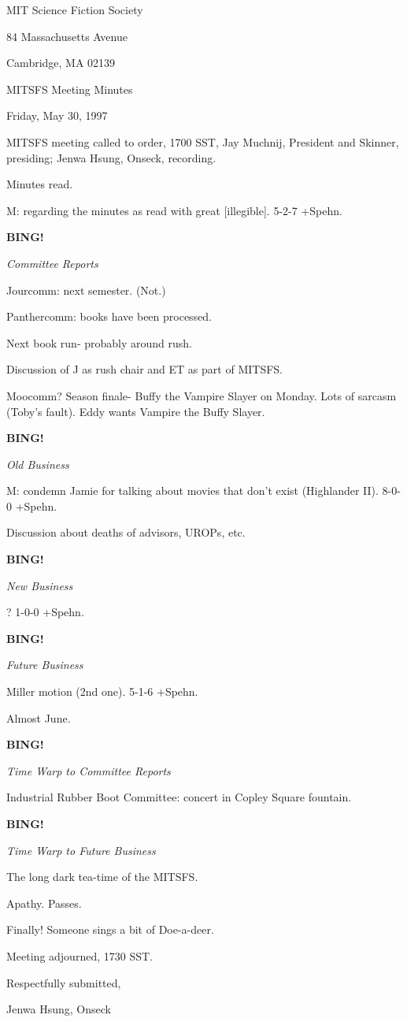 \documentclass[12pt]{article}
\newcommand{\bing}{{\bf BING!} }
\newcommand{\goto}[1]{\bing \vskip 12pt \centerline{{\em{#1}}}}
\begin{document}
\begin{center}

MIT Science Fiction Society 

84 Massachusetts Avenue

Cambridge, MA 02139

\vspace{12pt}

MITSFS Meeting Minutes 

Friday, May 30, 1997

\end{center}
 
\vspace{18pt}

\setlength{\parskip}{6pt}

\noindent
MITSFS meeting called to order, 1700 SST,
Jay Muchnij, President and Skinner, presiding; Jenwa Hsung, Onseck, recording.

Minutes read.

M: regarding the minutes as read with great [illegible]. 5-2-7 +Spehn.

\goto{Committee Reports}

Jourcomm: next semester. (Not.)

Panthercomm: books have been processed.

Next book run- probably around rush.

Discussion of J as rush chair and ET as part of MITSFS.

Moocomm? Season finale- Buffy the Vampire Slayer on Monday. Lots of sarcasm (Toby's fault). Eddy wants Vampire the Buffy Slayer.

\goto{Old Business}

M: condemn Jamie for talking about movies that don't exist (Highlander II). 8-0-0 +Spehn.

Discussion about deaths of advisors, UROPs, etc.

\goto{New Business}

? 1-0-0 +Spehn.

\goto{Future Business}

Miller motion (2nd one). 5-1-6 +Spehn.

Almost June.

\goto{Time Warp to Committee Reports}

Industrial Rubber Boot Committee: concert in Copley Square fountain.

\goto{Time Warp to Future Business}

The long dark tea-time of the MITSFS.

Apathy. Passes.

Finally! Someone sings a bit of Doe-a-deer.

\vspace{12pt}

\noindent
Meeting adjourned, 1730 SST.

\vspace{18pt}

\centerline{Respectfully submitted,}
\centerline{Jenwa Hsung, Onseck}
\end{document}
